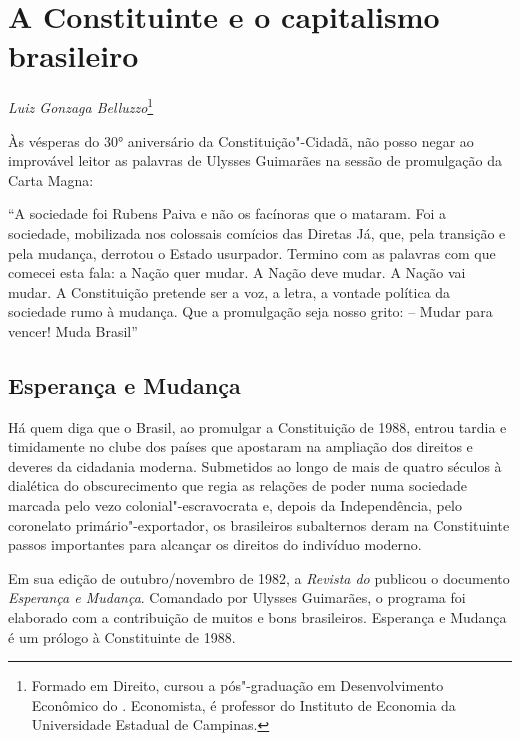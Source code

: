 \chapter*{A Constituinte e o capitalismo brasileiro}


\begin{flushright}
\emph{Luiz Gonzaga Belluzzo}\footnote{Formado em Direito, cursou a pós"-graduação em Desenvolvimento Econômico do . Economista, é professor do Instituto de Economia da Universidade Estadual de Campinas.}
\end{flushright}

Às vésperas do 30° aniversário da Constituição"-Cidadã, não posso negar
ao improvável leitor as palavras de Ulysses Guimarães na sessão de
promulgação da Carta Magna:

``A sociedade foi Rubens Paiva e não os facínoras que o mataram. Foi a
sociedade, mobilizada nos colossais comícios das Diretas Já, que, pela
transição e pela mudança, derrotou o Estado usurpador. Termino com as
palavras com que comecei esta fala: a Nação quer mudar. A Nação deve
mudar. A Nação vai mudar. A Constituição pretende ser a voz, a letra, a
vontade política da sociedade rumo à mudança. Que a promulgação seja
nosso grito: -- Mudar para vencer! Muda Brasil''

\section{Esperança e Mudança}

Há quem diga que o Brasil, ao promulgar a Constituição de 1988, entrou
tardia e timidamente no clube dos países que apostaram na ampliação dos
direitos e deveres da cidadania moderna. Submetidos ao longo de mais de
quatro séculos à dialética do obscurecimento que regia as relações de
poder numa sociedade marcada pelo vezo colonial"-escravocrata e, depois
da Independência, pelo coronelato primário"-exportador, os brasileiros
subalternos deram na Constituinte passos importantes para alcançar os
direitos do indivíduo moderno.

Em sua edição de outubro/novembro de 1982, a \emph{Revista do } publicou o
documento \emph{Esperança e Mudança}. Comandado por Ulysses Guimarães, o
programa foi elaborado com a contribuição de muitos e bons brasileiros.
Esperança e Mudança é um prólogo à Constituinte de 1988.

